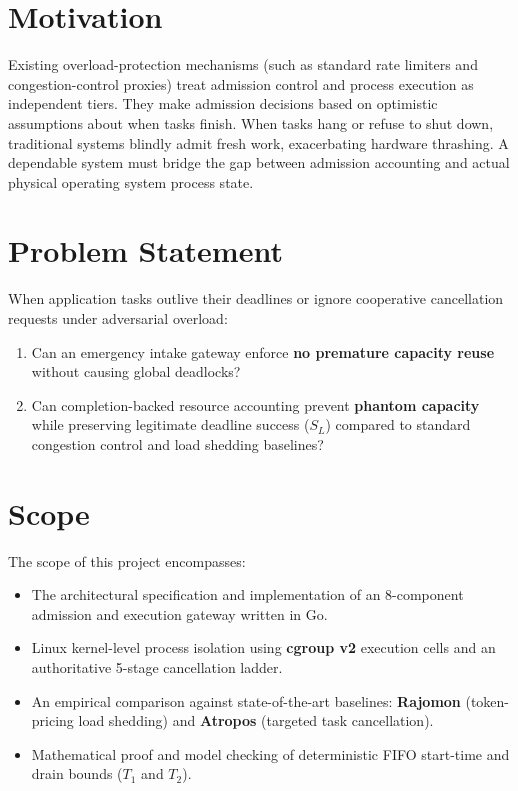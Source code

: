 \documentclass[12pt,a4paper]{report}
\begin{document}
\section{Motivation}
Existing overload-protection mechanisms (such as standard rate limiters and congestion-control proxies) treat admission control and process execution as independent tiers. They make admission decisions based on optimistic assumptions about when tasks finish. When tasks hang or refuse to shut down, traditional systems blindly admit fresh work, exacerbating hardware thrashing. A dependable system must bridge the gap between admission accounting and actual physical operating system process state.

\section{Problem Statement}
When application tasks outlive their deadlines or ignore cooperative cancellation requests under adversarial overload:
\begin{enumerate}
    \item Can an emergency intake gateway enforce \textbf{no premature capacity reuse} without causing global deadlocks?
    \item Can completion-backed resource accounting prevent \textbf{phantom capacity} while preserving legitimate deadline success ($S_L$) compared to standard congestion control and load shedding baselines?
\end{enumerate}

\section{Scope}
The scope of this project encompasses:
\begin{itemize}
    \item The architectural specification and implementation of an 8-component admission and execution gateway written in Go.
    \item Linux kernel-level process isolation using \textbf{cgroup v2} execution cells and an authoritative 5-stage cancellation ladder.
    \item An empirical comparison against state-of-the-art baselines: \textbf{Rajomon} (token-pricing load shedding) and \textbf{Atropos} (targeted task cancellation).
    \item Mathematical proof and model checking of deterministic FIFO start-time and drain bounds ($T_1$ and $T_2$).
\end{itemize}
\end{document}
